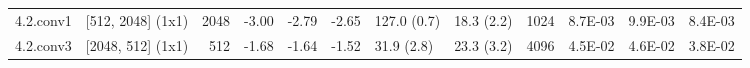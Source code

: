 \begin{table}
\begin{tabular}{llrrrrllrrrr}
4.2.conv1 & [512, 2048] (1x1) & 2048 & {\cellcolor[HTML]{FFF8B4}} \color[HTML]{000000} -3.00 & {\cellcolor[HTML]{FFFAB6}} \color[HTML]{000000} -2.79 & {\cellcolor[HTML]{FFFBB8}} \color[HTML]{000000} -2.65 & 127.0 (0.7) & 18.3 (2.2) & 1024 & {\cellcolor[HTML]{B9E176}} \color[HTML]{000000} 8.7E-03 & {\cellcolor[HTML]{C1E57B}} \color[HTML]{000000} 9.9E-03 & {\cellcolor[HTML]{B7E075}} \color[HTML]{000000} 8.4E-03 \\
4.2.conv3 & [2048, 512] (1x1) & 512 & {\cellcolor[HTML]{FAFDB8}} \color[HTML]{000000} -1.68 & {\cellcolor[HTML]{FAFDB8}} \color[HTML]{000000} -1.64 & {\cellcolor[HTML]{F8FCB6}} \color[HTML]{000000} -1.52 & 31.9 (2.8) & 23.3 (3.2) & 4096 & {\cellcolor[HTML]{F99355}} \color[HTML]{000000} 4.5E-02 & {\cellcolor[HTML]{F88C51}} \color[HTML]{F1F1F1} 4.6E-02 & {\cellcolor[HTML]{FDC372}} \color[HTML]{000000} 3.8E-02 \\
\bottomrule
\end{tabular}
\end{table}
